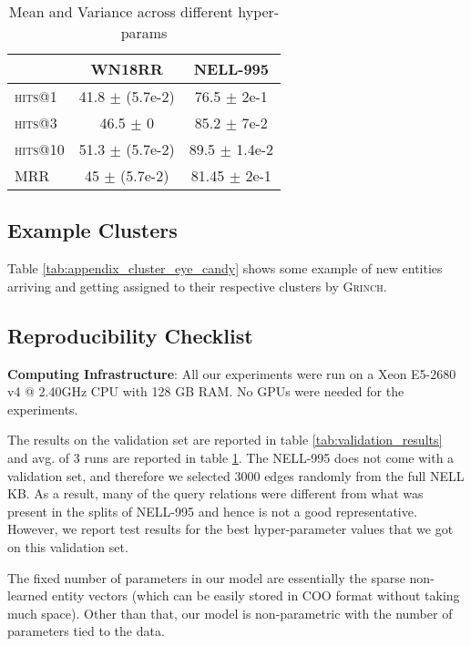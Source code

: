 \documentclass[11pt,a4paper]{article}
\newcommand{\nell}{NELL-995\xspace}
\newcommand{\grinch}{\textsc{Grinch}\xspace}
\begin{document}
\begin{table}
\centering
\small
\begin{tabular}{ l  c c}
\toprule
& \textbf{WN18RR} & \textbf{NELL-995}   \\ 
\midrule
  \textsc{hits}@1 & 41.8 $\pm$ (5.7e-2) & 76.5 $\pm$ 2e-1\\
  \textsc{hits}@3  & 46.5 $\pm$ 0 & 85.2 $\pm$ 7e-2\\
  \textsc{hits}@10  & 51.3 $\pm$ (5.7e-2)& 89.5 $\pm$ 1.4e-2\\
  \textsc{MRR}   &  45 $\pm$ (5.7e-2) & 81.45 $\pm$ 2e-1\\
\bottomrule
\end{tabular}
\caption{Mean and Variance across different hyper-params}
\label{tab:diff_hyper_param_test}
\end{table}

\subsection{Example Clusters}
Table \ref{tab:appendix_cluster_eye_candy} shows some example of new entities arriving and getting assigned to their respective clusters by \grinch.


\subsection{Reproducibility Checklist}
\label{sub:repro_check}
\noindent\textbf{Computing Infrastructure}: All our experiments were run on a Xeon E5-2680 v4 @ 2.40GHz CPU with 128 GB RAM. No GPUs were needed for the experiments.   

The results on the validation set are reported in table \ref{tab:validation_results} and avg. of 3 runs are reported in table \ref{tab:diff_hyper_param_test}. The \nell does not come with a validation set, and therefore we selected 3000 edges randomly from the full NELL KB. As a result, many of the query relations were different from what was present in the splits of \nell and hence is not a good representative. However, we report test results for the best hyper-parameter values that we got on this validation set. 

The fixed number of parameters in our model are essentially the sparse non-learned entity vectors (which can be easily stored in COO format without taking much space). Other than that, our model is non-parametric with the number of parameters tied to the data.
\end{document}
